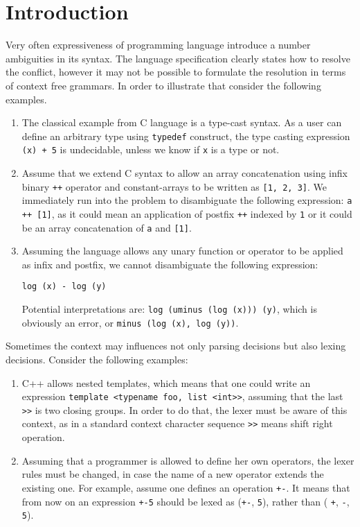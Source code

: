 \section{\label{sec:intro}Introduction}

Very often expressiveness of programming language introduce a number
ambiguities in its syntax.  The language specification clearly states
how to resolve the conflict, however it may not be possible to 
formulate the resolution in terms of context free grammars.  In order
to illustrate that consider the following examples.

\begin{enumerate}
    \item The classical example from C language is a type-cast 
          syntax.  As a user can define an arbitrary type using
          \verb|typedef| construct, the type casting expression
          \verb|(x) + 5| is undecidable, unless we know if
          \verb|x| is a type or not.
    \item Assume that we extend C syntax to allow an array 
          concatenation using infix binary \verb|++| operator and
          constant-arrays to be written as \verb|[1, 2, 3]|.
          We immediately run into the problem to disambiguate the 
          following expression: \verb|a ++ [1]|, as it could mean
          an application of postfix \verb|++| indexed by \verb|1|
          or it could be an array concatenation of \verb|a| and 
          \verb|[1]|.
    \item Assuming the language allows any unary function or operator
          to be applied as infix and postfix, we cannot 
          disambiguate the following expression:
\begin{verbatim}
log (x) - log (y)
\end{verbatim}
          Potential interpretations are: 
          \verb|log (uminus (log (x))) (y)|, which is obviously an 
          error, or \verb|minus (log (x), log (y))|.
\end{enumerate}

\noindent
Sometimes the context may influences not only parsing decisions but 
also lexing decisions.  Consider the following examples:
\begin{enumerate}
    \item C++ allows nested templates, which means that one could
          write an expression \verb|template <typename foo, list <int>>|, 
          assuming that the last \verb|>>| is two closing groups.  In
          order to do that, the lexer must be aware of this context,
          as in a standard context character sequence \verb|>>| means
          shift right operation.
    \item Assuming that a programmer is allowed to define her own 
          operators, the lexer rules must be changed, in case 
          the name of a new operator extends the existing one.  For
          example, assume one defines an operation \verb|+-|.
          It means that from now on an expression \verb|+-5| should
          be lexed as (\verb|+-|, \verb|5|), rather than (
          \verb|+|, \verb|-|, \verb|5|).
\end{enumerate}

